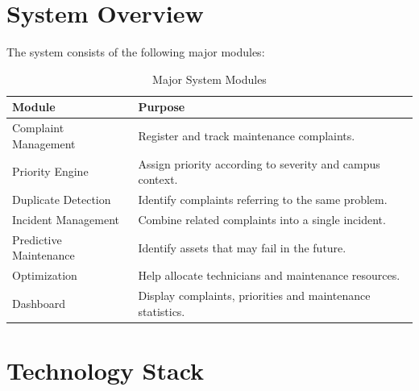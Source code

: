 \documentclass[12pt,a4paper]{article}
\begin{document}

\section{System Overview}

The system consists of the following major modules:

\begin{table}[H]
\centering
\renewcommand{\arraystretch}{1.3}

\begin{tabular}{p{} p{}}
\toprule
\textbf{Module} & \textbf{Purpose} \\
\midrule

Complaint Management &
Register and track maintenance complaints. \\

Priority Engine &
Assign priority according to severity and campus context. \\

Duplicate Detection &
Identify complaints referring to the same problem. \\

Incident Management &
Combine related complaints into a single incident. \\

Predictive Maintenance &
Identify assets that may fail in the future. \\

Optimization &
Help allocate technicians and maintenance resources. \\

Dashboard &
Display complaints, priorities and maintenance statistics. \\

\bottomrule
\end{tabular}

\caption{Major System Modules}

\end{table}



\section{Technology Stack}
\end{document}
